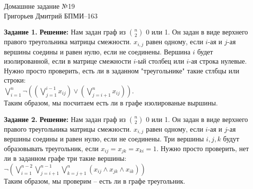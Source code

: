 \documentclass[12pt,a4paper]{scrartcl}
\begin{document}
	\begin{center}	
		Домашнне задание №19 \\
		Григорьев Дмитрий БПМИ--163
	\end{center}
	\textbf{Задание 1.}
	\newline
	\textbf{Решение:}
	\newline
	\indent
	Нам задан граф из $\binom{n}{2}$ 0 или 1. Он задан в виде верхнего правого треугольника матрицы смежности. $x_{i, j}$ равен одному, если $i$-ая и $j$-ая вершины соедины и равен нулю, если не соединены. Вершина $i$ будет изолированной, если в матрице смежности $i$-ый столбец или $i$-ая строка нулевые. Нужно просто проверить, есть ли в заданном "треугольнике" такие стлбцы или строки: \\
	$\bigvee_{i = 1}^{n} \neg((\bigvee_{j = 1}^{i - 1} x_{i j}) \lor (\bigvee_{j = i + 1}^{n} x_{i j}))$. \\
	Таким образом, мы посчитаем есть ли в графе изолированые выршины.
	\begin{flushright}	
		\textbf{}
	\end{flushright}
	\textbf{Задание 2.} 
	\newline
	\textbf{Решение:}
	\newline
	\indent
	Нам задан граф из $\binom{n}{2}$ 0 или 1. Он задан в виде верхнего правого треугольника матрицы смежности. $x_{i, j}$ равен одному, если $i$-ая и $j$-ая вершины соедины и равен нулю, если не соединены.
	Три вершины $i, j, k$ будут образовывать треугольник, если $x_{ij} = x_{jk} = x_{ki} = 1$. Нужно просто проверить, нет ли в заданном графе три такие вершины: \\
	$\neg(\bigvee_{i = 1}^{n - 2} \bigvee_{j = i + 1}^{n - 1} \bigvee_{k = j + 1}^{n} (x_{ij} \land x_{jk} \land x_{ik}))$ \\
	Таким образом, мы проверим -- есть ли в графе треугольник.
	
\end{document}

